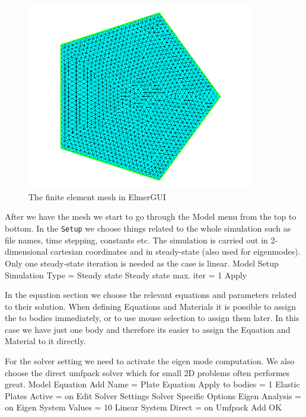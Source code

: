 \begin{figure}
\begin{center}
\includegraphics[width=100mm]{mesh}
\caption{The finite element mesh in ElmerGUI}\label{fg:pentagonmesh}
\end{center}
\end{figure}

After we have the mesh we start to go through the Model menu from the top to bottom. 
In the \texttt{Setup} we choose things related to the whole simulation such as file names, 
time stepping, constants etc.
The simulation is carried out in 2-dimensional cartesian
coordinates and in steady-state (also used for eigenmodes). 
Only one steady-state iteration is needed as the case is linear. 
\ttbegin
Model
  Setup 
    Simulation Type = Steady state
    Steady state max. iter = 1
    Apply
\ttend

In the equation section we choose the relevant equations and parameters related to their solution. 
When defining Equations and Materials it is possible to assign the to bodies immediately, or to use mouse
selection to assign them later. In this case we have just one body and therefore its easier to assign 
the Equation and Material to it directly.

For the solver setting we need to activate the eigen mode computation. We also choose the 
direct umfpack solver which for small 2D problems often performes great.
\ttbegin
Model
  Equation
    Add 
      Name = Plate Equation
      Apply to bodies = 1
      Elastic Plates
        Active = on
        Edit Solver Settings 
          Solver Specific Options
            Eigen Analysis = on
            Eigen System Values = 10
          Linear System
            Direct = on
              Umfpack              
    Add  
    OK
\ttend        

